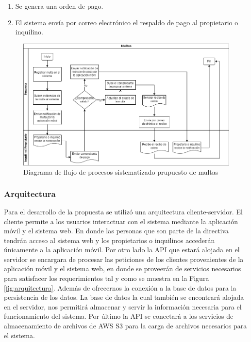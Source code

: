 \begin{itemize}
\begin{enumerate}
\begin{enumerate}
            \item Se genera una orden de pago.
            \item El sistema envía por correo electrónico el respaldo de pago al propietario o inquilino.
        \end{enumerate}
        \begin{figure}[H]
            \centering
            \includegraphics[width=1\textwidth]{resources/images/Diagrama de flujo de proceso multas propuesta}
            \caption{Diagrama de flujo de procesos sistematizado prupuesto de multas}
            \label{fig:flujo-proceso-prupuesto-multas}
        \end{figure}
    \end{enumerate}
\end{itemize}


\subsubsection{Arquitectura}

Para el desarrollo de la propuesta se utilizó una arquitectura cliente-servidor.
El cliente permite a los usuarios interactuar con el sistema mediante la aplicación móvil y el sistema web.
En donde las personas que son parte de la directiva tendrán acceso al sistema web y los propietarios o inquilinos accederán únicamente a la aplicación móvil.
Por otro lado la API que estará alojada en el servidor se encargara de procesar las peticiones de los clientes provenientes de la aplicación móvil y el sistema web, en  donde se proveerán de servicios necesarios para satisfacer los requerimientos tal y como se muestra en la Figura \ref{fig:arquitectura}.
Además de ofrecernos la conexión a la base de datos para la persistencia de los datos.
La base de datos la cual también se encontrará alojada en el servidor, nos permitirá almacenar y servir la información necesaria para el funcionamiento del sistema.
Por último la API se conectará a los servicios de almacenamiento de archivos de AWS S3 para la carga de archivos necesarios para el sistema.

